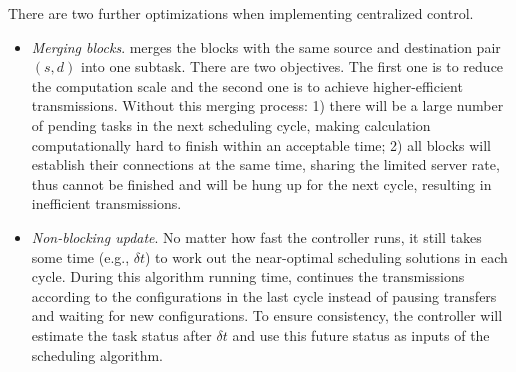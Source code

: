 There are two further optimizations when implementing centralized control.
\begin{itemize}
\item \emph{Merging blocks}. \name merges the blocks with the same source and destination pair $(s,d)$ into one subtask. There are two objectives. The first one is to reduce the computation scale and the second one is to achieve higher-efficient transmissions. Without this merging process: 1) there will be a large number of pending tasks in the next scheduling cycle, making calculation computationally hard to finish within an acceptable time; 2) all blocks will establish their connections at the same time, sharing the limited server rate, thus cannot be finished and will be hung up for the next cycle, resulting in inefficient transmissions.%
\item \emph{Non-blocking update}. No matter how fast the controller runs, it still takes some time (e.g., $\delta t$) to work out the near-optimal scheduling solutions in each cycle. During this algorithm running time, \name continues the transmissions according to the configurations in the last cycle instead of pausing transfers and waiting for new configurations. To ensure consistency, the controller will estimate the task status after $\delta t$ and use this future status as inputs of the scheduling algorithm.
\end{itemize}

%
%
%
%

